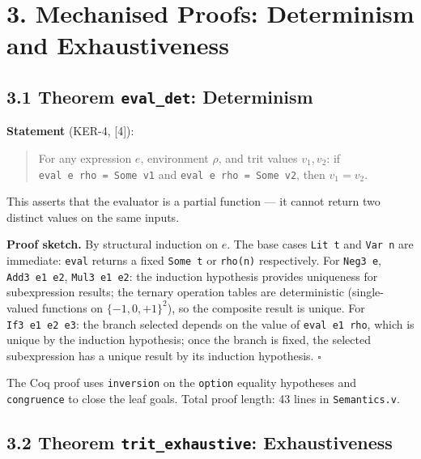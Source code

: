 \section{3. Mechanised Proofs: Determinism and
Exhaustiveness}\label{fa_27:mechanised-proofs-determinism-and-exhaustiveness}

\subsection{\texorpdfstring{3.1 Theorem
\texttt{eval\_det}:
Determinism}{3.1 Theorem eval\_det: Determinism}}\label{fa_27:theorem-eval_det-determinism}

\textbf{Statement} (KER-4,
[4]):

\begin{quote}
For any expression \(e\), environment \(\rho\),
and trit values \(v_1, v_2\): if
\texttt{eval\ e\ rho\ =\ Some\ v1} and
\texttt{eval\ e\ rho\ =\ Some\ v2}, then
\(v_1 = v_2\).
\end{quote}

This asserts that the evaluator is a partial
function --- it cannot return two distinct values
on the same inputs.

\textbf{Proof sketch.} By structural induction on
\(e\). The base cases \texttt{Lit\ t} and
\texttt{Var\ n} are immediate: \texttt{eval}
returns a fixed \texttt{Some\ t} or
\texttt{rho(n)} respectively. For
\texttt{Neg3\ e\textquotesingle{}},
\texttt{Add3\ e1\ e2}, \texttt{Mul3\ e1\ e2}: the
induction hypothesis provides uniqueness for
subexpression results; the ternary operation
tables are deterministic (single-valued functions
on \(\{-1,0,+1\}^2\)), so the composite result is
unique. For \texttt{If3\ e1\ e2\ e3}: the branch
selected depends on the value of
\texttt{eval\ e1\ rho}, which is unique by the
induction hypothesis; once the branch is fixed,
the selected subexpression has a unique result by
its induction hypothesis. \(\square\)

The Coq proof uses \texttt{inversion} on the
\texttt{option} equality hypotheses and
\texttt{congruence} to close the leaf goals. Total
proof length: 43 lines in \texttt{Semantics.v}.

\subsection{\texorpdfstring{3.2 Theorem
\texttt{trit\_exhaustive}:
Exhaustiveness}{3.2 Theorem trit\_exhaustive: Exhaustiveness}}\label{fa_27:theorem-trit_exhaustive-exhaustiveness}

